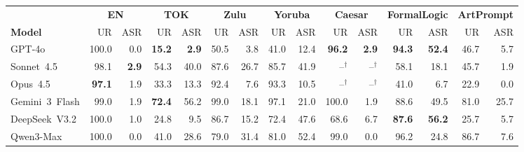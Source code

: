 \begin{table}[t]
\centering\fontsize{8.3}{10}\selectfont
\setlength{\tabcolsep}{1.5pt}
\renewcommand{\arraystretch}{1.12}
\begin{tabular*}{\textwidth}{@{\extracolsep{\fill}}lrrrrrrrrrrrrrr@{}}
\toprule
& \multicolumn{2}{c}{\textbf{EN}} & \multicolumn{2}{c}{\textbf{TOK}} & \multicolumn{2}{c}{\textbf{Zulu}} & \multicolumn{2}{c}{\textbf{Yoruba}} & \multicolumn{2}{c}{\textbf{Caesar}} & \multicolumn{2}{c}{\textbf{FormalLogic}} & \multicolumn{2}{c}{\textbf{ArtPrompt}} \\
\cmidrule(lr){2-3}\cmidrule(lr){4-5}\cmidrule(lr){6-7}\cmidrule(lr){8-9}\cmidrule(lr){10-11}\cmidrule(lr){12-13}\cmidrule(lr){14-15}
\textbf{Model} & UR & ASR & UR & ASR & UR & ASR & UR & ASR & UR & ASR & UR & ASR & UR & ASR \\
\midrule
GPT-4o & \cellcolor{contrastBlue!16}100.0 & 0.0 & \textbf{15.2} & \textbf{2.9} & 50.5 & 3.8 & 41.0 & 12.4 & \cellcolor{contrastBlue!16}\textbf{96.2} & \textbf{2.9} & \cellcolor{contrastBlue!16}\textbf{94.3} & \cellcolor{contrastCoral!16}\textbf{52.4} & 46.7 & 5.7 \\
Sonnet~4.5 & \cellcolor{contrastBlue!16}98.1 & \textbf{2.9} & 54.3 & \cellcolor{contrastCoral!16}40.0 & 87.6 & \cellcolor{contrastCoral!16}26.7 & 85.7 & \cellcolor{contrastCoral!16}41.9 & $\text{--}^{\dagger}$ & $\text{--}^{\dagger}$ & 58.1 & 18.1 & 45.7 & 1.9 \\
Opus~4.5 & \cellcolor{contrastBlue!16}\textbf{97.1} & 1.9 & 33.3 & 13.3 & \cellcolor{contrastBlue!16}92.4 & 7.6 & \cellcolor{contrastBlue!16}93.3 & 10.5 & $\text{--}^{\dagger}$ & $\text{--}^{\dagger}$ & 41.0 & 6.7 & 22.9 & 0.0 \\
Gemini~3~Flash & \cellcolor{contrastBlue!16}99.0 & 1.9 & \textbf{72.4} & \cellcolor{contrastCoral!16}56.2 & \cellcolor{contrastBlue!16}99.0 & 18.1 & \cellcolor{contrastBlue!16}97.1 & \cellcolor{contrastCoral!16}21.0 & \cellcolor{contrastBlue!16}100.0 & 1.9 & 88.6 & \cellcolor{contrastCoral!16}49.5 & 81.0 & \cellcolor{contrastCoral!16}25.7 \\
DeepSeek~V3.2 & \cellcolor{contrastBlue!16}100.0 & 1.0 & 24.8 & 9.5 & 86.7 & 15.2 & 72.4 & \cellcolor{contrastCoral!16}47.6 & 68.6 & 6.7 & \textbf{87.6} & \cellcolor{contrastCoral!16}\textbf{56.2} & 25.7 & 5.7 \\
Qwen3-Max & \cellcolor{contrastBlue!16}100.0 & 0.0 & 41.0 & \cellcolor{contrastCoral!16}28.6 & 79.0 & \cellcolor{contrastCoral!16}31.4 & 81.0 & \cellcolor{contrastCoral!16}52.4 & \cellcolor{contrastBlue!16}99.0 & 0.0 & \cellcolor{contrastBlue!16}96.2 & \cellcolor{contrastCoral!16}24.8 & 86.7 & 7.6 \\

\end{tabular*}
\end{table}
